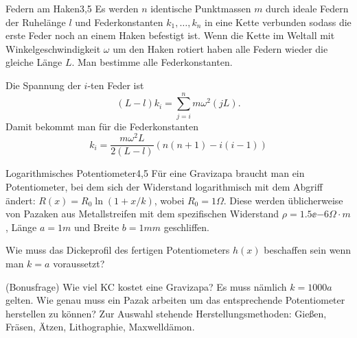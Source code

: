 



\begin{problem}{Federn am Haken}{3,5}
Es werden $n$ identische Punktmassen $m$ durch ideale Federn der Ruhelänge $l$ und Federkonstanten $k_1,\dots, k_n$ in eine Kette verbunden sodass die erste Feder noch an einem Haken befestigt ist. Wenn die Kette im Weltall mit Winkelgeschwindigkeit $\omega$ um den Haken rotiert haben alle Federn wieder die gleiche Länge $L$. Man bestimme alle Federkonstanten.
\begin{solution}
Die Spannung der $i$-ten Feder ist
\[
(L-l) k_i = \sum_{j=i}^n m \omega^2 (jL).
\]
Damit bekommt man für die Federkonstanten
\[
k_i = \frac{m \omega^2 L}{2 (L-l)} \left( n(n+1) - i(i-1) \right)
\]
\end{solution}
\end{problem}

\begin{problem}{Logarithmisches Potentiometer}{4,5}
Für eine Gravizapa braucht man ein Potentiometer, bei dem sich der Widerstand logarithmisch mit dem Abgriff ändert: $R(x) = R_0 \ln(1+x/k)$, wobei $R_0 = 1 \unit{\Omega}$. Diese werden üblicherweise von Pazaken aus Metallstreifen mit dem spezifischen Widerstand $\rho = 1.5\ee{-6} \unit{\Omega\cdot m}$, Länge $a = 1\unit{m}$ und Breite $b = 1\unit{mm}$ geschliffen.
\begin{abcenum}
\item Wie muss das Dickeprofil des fertigen Potentiometers $h(x)$ beschaffen sein wenn man $k=a$ voraussetzt?
\item (Bonusfrage) Wie viel KC kostet eine Gravizapa? Es muss nämlich $k=1000 a$ gelten. Wie genau muss ein Pazak arbeiten um das entsprechende Potentiometer herstellen zu können? Zur Auswahl stehende Herstellungsmethoden: Gießen, Fräsen, Ätzen, Lithographie, Maxwelldämon.
\end{abcenum}
\end{problem}


